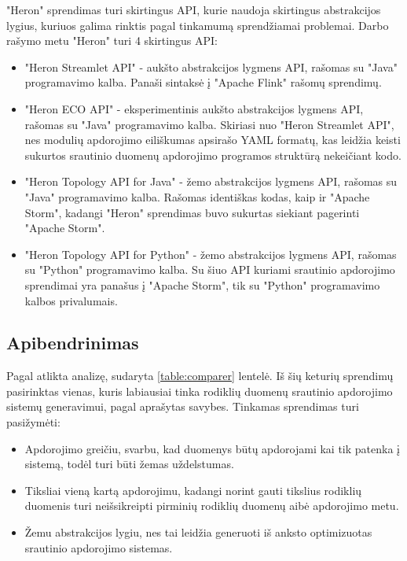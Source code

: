 \documentclass{VUMIFPSbakalaurinis}
\begin{document}
"Heron" sprendimas turi skirtingus API, kurie naudoja skirtingus abstrakcijos lygius, kuriuos galima rinktis pagal tinkamumą sprendžiamai problemai. Darbo rašymo metu "Heron" turi 4 skirtingus API:
\begin{itemize}
    \item "Heron Streamlet API" - aukšto abstrakcijos lygmens API, rašomas su "Java" programavimo kalba. Panaši sintaksė į "Apache Flink" rašomų sprendimų.
    \item "Heron ECO API" - eksperimentinis aukšto abstrakcijos lygmens API, rašomas su "Java" programavimo kalba. Skiriasi nuo "Heron Streamlet API", nes modulių apdorojimo eiliškumas apsirašo YAML formatų, kas leidžia keisti sukurtos srautinio duomenų apdorojimo programos struktūrą nekeičiant kodo.
    \item "Heron Topology API for Java" - žemo abstrakcijos lygmens API, rašomas su "Java" programavimo kalba. Rašomas identiškas kodas, kaip ir "Apache Storm", kadangi "Heron" sprendimas buvo sukurtas siekiant pagerinti "Apache Storm".
    \item "Heron Topology API for Python" - žemo abstrakcijos lygmens API, rašomas su "Python" programavimo kalba. Su šiuo API kuriami srautinio apdorojimo sprendimai yra panašus į "Apache Storm", tik su "Python" programavimo kalbos privalumais.
\end{itemize}  


\subsection{Apibendrinimas}

Pagal atlikta analizę, sudaryta \ref{table:comparer} lentelė. Iš šių keturių sprendimų pasirinktas vienas, kuris labiausiai tinka rodiklių duomenų srautinio apdorojimo sistemų generavimui, pagal aprašytas savybes. Tinkamas sprendimas turi pasižymėti: 
\begin{itemize}
    \item Apdorojimo greičiu, svarbu, kad duomenys būtų apdorojami kai tik patenka į sistemą, todėl turi būti žemas uždelstumas.
    \item Tiksliai vieną kartą apdorojimu, kadangi norint gauti tikslius rodiklių duomenis turi neišsikreipti pirminių rodiklių duomenų aibė apdorojimo metu.
    \item Žemu abstrakcijos lygiu, nes tai leidžia generuoti iš anksto optimizuotas srautinio apdorojimo sistemas.  
\end{itemize} 
\end{document}

